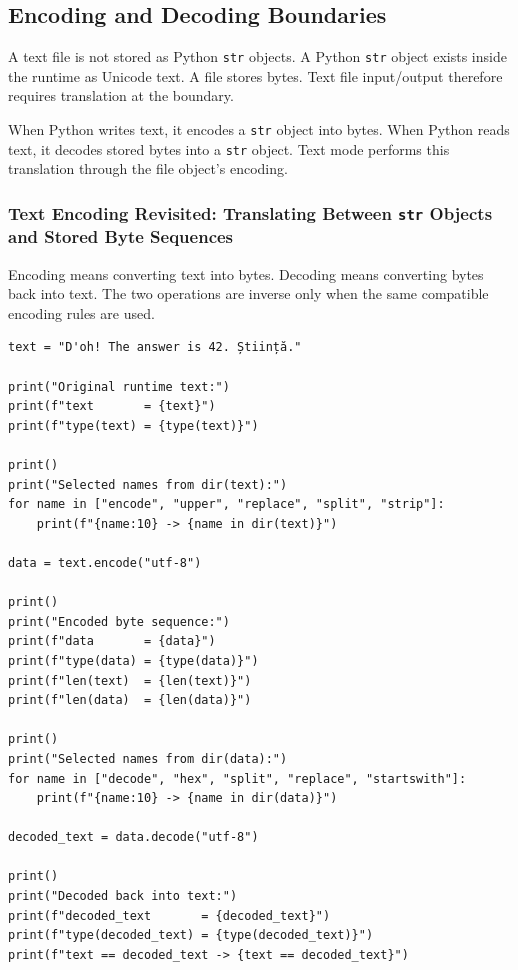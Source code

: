 \subsection{Encoding and Decoding Boundaries}

A text file is not stored as Python \texttt{str} objects. A Python \texttt{str} object exists inside the runtime as Unicode text. A file stores bytes. Text file input/output therefore requires translation at the boundary.

When Python writes text, it encodes a \texttt{str} object into bytes. When Python reads text, it decodes stored bytes into a \texttt{str} object. Text mode performs this translation through the file object's encoding.

\subsubsection{Text Encoding Revisited: Translating Between \texttt{str} Objects and Stored Byte Sequences}

Encoding means converting text into bytes. Decoding means converting bytes back into text. The two operations are inverse only when the same compatible encoding rules are used.

\begin{verbatim}
text = "D'oh! The answer is 42. Știință."

print("Original runtime text:")
print(f"text       = {text}")
print(f"type(text) = {type(text)}")

print()
print("Selected names from dir(text):")
for name in ["encode", "upper", "replace", "split", "strip"]:
    print(f"{name:10} -> {name in dir(text)}")

data = text.encode("utf-8")

print()
print("Encoded byte sequence:")
print(f"data       = {data}")
print(f"type(data) = {type(data)}")
print(f"len(text)  = {len(text)}")
print(f"len(data)  = {len(data)}")

print()
print("Selected names from dir(data):")
for name in ["decode", "hex", "split", "replace", "startswith"]:
    print(f"{name:10} -> {name in dir(data)}")

decoded_text = data.decode("utf-8")

print()
print("Decoded back into text:")
print(f"decoded_text       = {decoded_text}")
print(f"type(decoded_text) = {type(decoded_text)}")
print(f"text == decoded_text -> {text == decoded_text}")
\end{verbatim}

